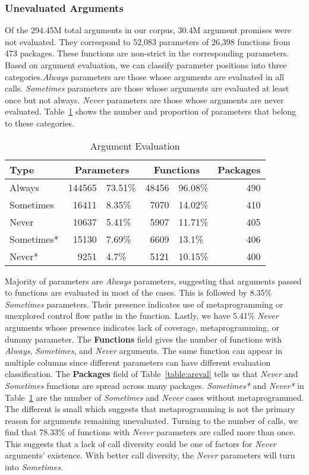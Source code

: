 \documentclass[review,nonacm,screen,acmsmall,anonymous=true]{acmart}
\newcommand{\always}{\emph{Always}\xspace}
\newcommand{\sometimes}{\emph{Sometimes}\xspace}
\newcommand{\sometimesStar}{\emph{Sometimes*}\xspace}
\newcommand{\never}{\emph{Never}\xspace}
\newcommand{\neverStar}{\emph{Never*}\xspace}
\begin{document}
\subsubsection{Unevaluated Arguments}
Of the 294.45M total arguments in our corpus, 30.4M argument promises were not
evaluated. They correspond to 52,083 parameters of 26,398 functions from 473
packages. These functions are non-strict in the corresponding parameters.
%
Based on argument evaluation, we can classify parameter positions into three
categories.\always parameters are those whose arguments are evaluated in all
calls. \sometimes parameters are those whose arguments are evaluated at least
once but not always. \never parameters are those whose arguments are never
evaluated. Table~\ref{table:argeval} shows the number and proportion of
parameters that belong to these categories.

\begin{table}[!h]
  \vspace{-3mm}
  \caption{Argument Evaluation}\label{table:argeval}
  \vspace{-3mm}
  \begin{tabular}{lr|lr|lr}
    \toprule
    \textbf{Type}&\multicolumn{2}{c}{\textbf{Parameters}}&\multicolumn{2}{c}{\textbf{Functions}}&\textbf{Packages}\\
    \midrule
    Always&144565&73.51\%&48456&96.08\%&490\\
    Sometimes&16411&8.35\%&7070&14.02\%&410\\
    Never&10637&5.41\%&5907&11.71\%&405\\
    \midrule
    Sometimes*&15130&7.69\%&6609&13.1\%&406\\
    Never*&9251&4.7\%&5121&10.15\%&400\\
    \bottomrule
  \end{tabular}
\end{table}

Majority of parameters are \always parameters, suggesting that arguments passed
to functions are evaluated in most of the cases. This is followed by 8.35\%
\sometimes parameters. Their presence indicates use of metaprogramming or
unexplored control flow paths in the function. Lastly, we have 5.41\% \never
arguments whose presence indicates lack of coverage, metaprogramming, or dummy
parameter. The \textbf{Functions} field gives the number of functions with
\always, \sometimes, and \never arguments. The same function can appear in
multiple columns since different parameters can have different evaluation
classification. The \textbf{Packages} field of Table~\ref{table:areval} tells us
that \never and \sometimes functions are spread across many packages.
%
\sometimesStar and \neverStar in Table~\ref{table:argeval} are the number of
\sometimes and \never cases without metaprogrammed. The different is small which
suggests that metaprogramming is not the primary reason for arguments remaining
unevaluated. Turning to the number of calls, we find that 78.33\% of functions
with \never parameters are called more than once. This suggests that a lack of
call diversity could be one of factors for \never arguments' existence. With
better call diversity, the \never parameters will turn into \sometimes.
\end{document}
